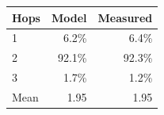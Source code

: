 \begin{tabular}{@{}lrr@{}}
\toprule
Hops & Model & Measured \\
\midrule
1 & 6.2\% & 6.4\% \\
2 & 92.1\% & 92.3\% \\
3 & 1.7\% & 1.2\% \\
\midrule
Mean & 1.95 & 1.95 \\
\bottomrule
\end{tabular}
